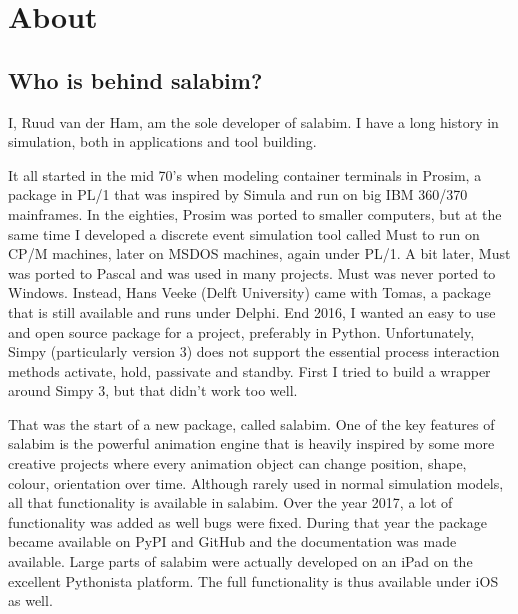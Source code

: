 \documentclass[letterpaper,10pt,english]{sphinxmanual}
\begin{document}
\chapter{About}
\label{\detokenize{About::doc}}\label{\detokenize{About:about}}

\section{Who is behind salabim?}
\label{\detokenize{About:who-is-behind-salabim}}
I, Ruud van der Ham, am the sole developer of salabim. I have a long history in simulation, both in
applications and tool building.

It all started in the mid 70’s when modeling container terminals in Prosim, a package
in PL/1 that was inspired by Simula and run on big IBM 360/370 mainframes. 
In the eighties, Prosim was ported to smaller computers, but at the same time I
developed a discrete event simulation tool called Must to run on CP/M machines, later
on MSDOS machines, again under PL/1. A bit later, Must was ported to Pascal and was
used in many projects. Must was never ported to Windows. Instead, Hans Veeke (Delft University)
came with Tomas, a package that is still available and runs under Delphi. 
End 2016, I wanted an easy to use and open source package for a project, preferably
in Python. Unfortunately, Simpy (particularly version 3) does not support the essential
process interaction methods activate, hold, passivate and standby. First I tried to
build a wrapper around Simpy 3, but that didn’t work too well.

That was the start of a new package, called salabim.
One of the key features of salabim is the powerful animation engine that is heavily
inspired by some more creative projects where every animation object can change position,
shape, colour, orientation over time. Although rarely used in normal simulation models,
all that functionality is available in salabim. 
Over the year 2017, a lot of functionality was added as well bugs were fixed. During that year
the package became available on PyPI and GitHub and the documentation was made available. 
Large parts of salabim were actually developed on an iPad on the excellent Pythonista platform. The full
functionality is thus available under iOS as well.
\end{document}
